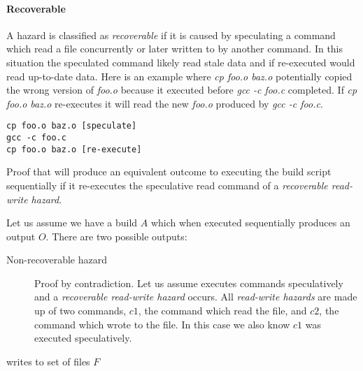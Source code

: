 \paragraph{Recoverable}
A hazard is classified as \emph{recoverable} if it is caused by \Rattle speculating a command which read a file concurrently or later written to by another command.  In this situation the speculated command likely read stale data and if re-executed would read up-to-date data.  Here is an example where \emph{cp foo.o baz.o} potentially copied the wrong version of \emph{foo.o} because it executed before \emph{gcc -c foo.c} completed.  If \emph{cp foo.o baz.o} re-executes it will read the new \emph{foo.o} produced by \emph{gcc -c foo.c}.  

\begin{verbatim}
cp foo.o baz.o [speculate]
gcc -c foo.c
cp foo.o baz.o [re-execute]
\end{verbatim}

Proof that \Rattle will produce an equivalent outcome to executing the build script sequentially if it re-executes the speculative read command of a \emph{recoverable read-write hazard}.





Let us assume we have a build $A$ which when executed sequentially produces an output $O$.
There are two possible outputs:
\begin{description}
\item [Non-recoverable hazard] Proof by contradiction.
  Let us assume \Rattle executes commands speculatively and a \emph{recoverable read-write hazard} occurs.  All \emph{read-write hazards} are made up of two commands, $c1$, the command which read the file, and $c2$, the command which wrote to the file. In this case we also know $c1$ was executed speculatively.
  
  
\item [writes to set of files $F$]
\end{description}






